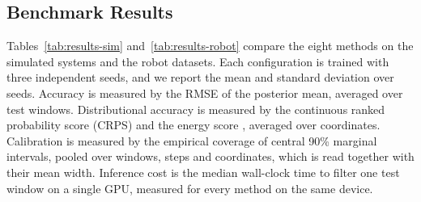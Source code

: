 \subsection{Benchmark Results}\label{sec:experiments-results}
Tables~\ref{tab:results-sim} and~\ref{tab:results-robot} compare the eight methods on the simulated systems and the robot datasets. Each configuration is trained with three independent seeds, and we report the mean and standard deviation over seeds. Accuracy is measured by the RMSE of the posterior mean, averaged over test windows. Distributional accuracy is measured by the continuous ranked probability score (CRPS) and the energy score \citep{gneiting2007proper}, averaged over coordinates. Calibration is measured by the empirical coverage of central 90\% marginal intervals, pooled over windows, steps and coordinates, which is read together with their mean width. Inference cost is the median wall-clock time to filter one test window on a single GPU, measured for every method on the same device. 

\begin{table}[htbp]
\centering\footnotesize
\resizebox{\linewidth}{!}{%

}
\caption{Test results on the simulated systems for the four direct estimators and the four particle filters (PF). Entries are the mean $\pm$ standard deviation over three training seeds. Each method returns $M$ posterior draws per window as in Table~\ref{tab:datasets}, and the particle filters run with the particle count of the dataset protocol. Bold marks the best learned method per dataset, which for coverage is the one closest to the nominal level of 0.90. RMSE and width are in the metric units of Table~\ref{tab:datasets}. Latency is the median time in milliseconds to filter one test window, measured for seed 0 on one NVIDIA L40S with compilation excluded (Appendix~\ref{app:protocol}), and bold marks the fastest learned method. The rows labeled ``ref.'' are model-based reference filters with the true dynamics, which are not competitors.}
\label{tab:results-sim}
\end{table}

